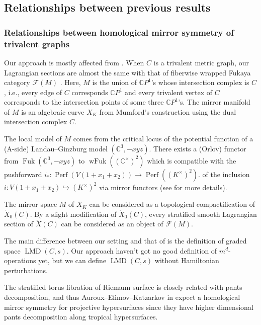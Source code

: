 \documentclass[a4paper,dvipdfmx,reqno,12pt]{amsart}
\theoremstyle{definition}
\newcommand{\C}{\mathbb{C}}%
\newcommand{\mcal}[1]{\mathcal{#1}}%
\newcommand{\opn}[1]{\operatorname{#1}}
\newcommand{\hookto}{\hookrightarrow}
\numberwithin{equation}{section}
\begin{document}
\subsection{Relationships between previous results}
\label{section-tropical-curve-note}


\subsubsection{Relationships between
homological mirror symmetry of trivalent graphs}
\label{section-syz-trivalent-graph}

Our approach is mostly affected from 
\cite{auroux2022lagrangian}.
\label{section-syz-trivalent-graph}
When $C$ is a trivalent metric graph, 
our Lagrangian sections are 
almost the same with that of fiberwise wrapped Fukaya category 
$\mcal{F}(M)$ \cite[3.1]{auroux2022lagrangian}.
Here, $M$ is the
union of $\C P^{1}$'s whose intersection complex is $C$, 
i.e., every edge of $C$ corresponds
$\C P^{1}$ and every trivalent vertex of $C$ corresponds
to the intersection points of some three $\C P^{1}$'s.
The mirror manifold of $M$ is an algebraic curve $X_K$
from Mumford's construction using the dual intersection
complex $C$.

The local model of $M$ comes from the critical locus
of the potential function of a (A-side) Landau--Ginzburg 
model $(\C^{3},-xyz)$. There exists a (Orlov) functor
from $\opn{Fuk}(\C^{3},-xyz)$ 
to $\opn{wFuk}((\C^{\times})^2)$ which is compatible
with the pushforward 
$i_*\colon \opn{Perf}(V(1+x_1+x_2))\to \opn{Perf}((K^{\times})^{2})$. 
of the inclusion $i\colon V(1+x_1+x_2)\hookto (K^{\times})^2$
via mirror functors (see \cite[2.]{auroux2022lagrangian}
for more details). 

The mirror space $M$ of $X_K$ can be considered as a 
topological compactification of $\check{X}_0(C)$.
By a slight modification of $\check{X}_0(C)$, every 
stratified smooth Lagrangian section of $\check{X}(C)$ 
can be considered as an object of $\mcal{F}(M)$.

The main difference between our setting and 
that of \cite{auroux2022lagrangian} 
is the definition of graded space $\opn{LMD}(C,s)$. 
Our approach haven't got no good definition 
of $m^{d}$-operations yet, 
but we can define $\opn{LMD}(C,s)$ 
without Hamiltonian
perturbations.


The stratified torus fibration of Riemann surface is 
closely related with pants decomposition, and thus
Auroux--Efimov--Katzarkov in \cite{auroux2022lagrangian} 
expect a homological mirror symmetry 
for projective hypersurfaces since they have higher 
dimensional pants decomposition \cite{MR2079993} along
tropical hypersurfaces.
\end{document}
